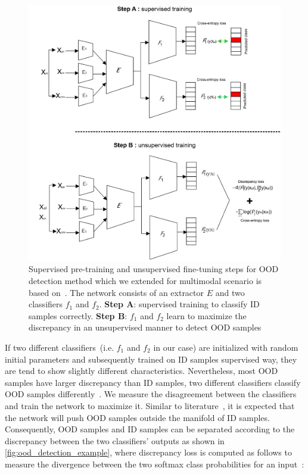 \begin{figure}
    \centering
    \includegraphics[scale=0.7]{images/OOD_1.png}
    \caption[Supervised pre-training and unsupervised fine-tuning steps for OOD detection]{Supervised pre-training and unsupervised fine-tuning steps for OOD detection method which we extended for multimodal scenario is based on~\cite{yu2019unsupervised}. The network consists of an extractor $E$ and two classifiers $f_{1}$ and $f_{2}$. \textbf{Step A}: supervised training to classify ID samples correctly. \textbf{Step B}: $f_{1}$ and $f_{2}$ learn to maximize the discrepancy in an unsupervised manner to detect OOD samples}
    \label{fig:ood_network}
    \vspace{-2mm}
\end{figure}

\hspace*{3.5mm} If two different classifiers~(i.e. $f_{1}$ and $f_{2}$ in our case) are initialized with random initial parameters and subsequently trained on ID samples supervised way, they are tend to show slightly different characteristics. Nevertheless, most OOD samples have larger discrepancy than ID samples, two different classifiers classify OOD samples differently~\cite{OOD19}. 
We measure the disagreement between the classifiers and train the network to maximize it. Similar to literature~\cite{OOD19}, it is expected that the network will push OOD samples outside the manifold of ID samples. Consequently, OOD samples and ID samples can be separated according to the discrepancy between the two classifiers’ outputs as shown in \cref{fig:ood_detection_example}, where discrepancy loss is computed as follows to measure the divergence between the two softmax class probabilities for an input~\cite{OOD19}: 

